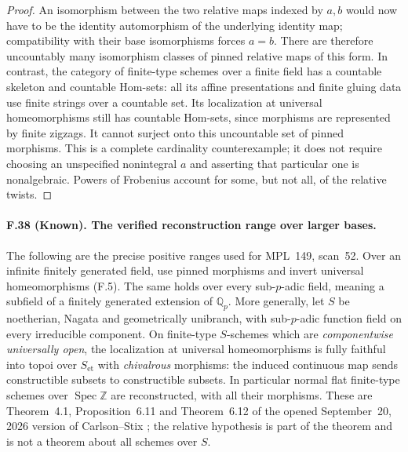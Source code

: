 \begin{proof}
An isomorphism between the two relative maps indexed by $a,b$ would now
have to be the identity automorphism of the underlying identity map;
compatibility with their base isomorphisms forces $a=b$. There are
therefore uncountably many isomorphism classes of pinned relative maps
of this form. In contrast, the category of finite-type schemes over a
finite field has a countable skeleton and countable Hom-sets: all its
affine presentations and finite gluing data use finite strings over a
countable set. Its localization at universal homeomorphisms still has
countable Hom-sets, since morphisms are represented by finite zigzags.
It cannot surject onto this uncountable set of pinned morphisms.
This is a complete cardinality counterexample; it does not require
choosing an unspecified nonintegral $a$ and asserting that particular
one is nonalgebraic. Powers of Frobenius account for some, but not all,
of the relative twists.
\end{proof}

\paragraph{F.38 (Known). The verified reconstruction range over larger bases.}
The following are the precise positive ranges used for MPL~149,
scan~52. Over an infinite finitely generated field, use pinned morphisms
and invert universal homeomorphisms (F.5). The same holds over every
sub-$p$-adic field, meaning a subfield of a finitely generated extension
of $\mathbb Q_p$. More generally, let $S$ be noetherian, Nagata and
geometrically unibranch, with sub-$p$-adic function field on every
irreducible component. On finite-type $S$-schemes which are
\emph{componentwise universally open}, the localization at universal
homeomorphisms is fully faithful into topoi over $S_{\mathrm{et}}$ with
\emph{chivalrous} morphisms: the induced continuous map sends
constructible subsets to constructible subsets. In particular normal
flat finite-type schemes over $\operatorname{Spec}\mathbb Z$ are
reconstructed, with all their morphisms. These are Theorem~4.1,
Proposition~6.11 and Theorem~6.12 of the opened September~20, 2026 version
of Carlson--Stix \cite{CarlsonStix2026}; the relative hypothesis is part
of the theorem and is not a theorem about all schemes over $S$.

